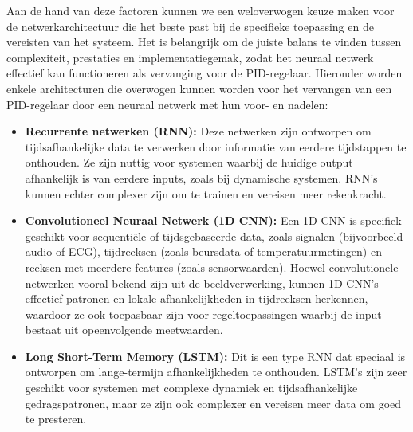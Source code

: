 Aan de hand van deze factoren kunnen we een weloverwogen keuze maken voor de netwerkarchitectuur die het beste past bij de specifieke toepassing en de vereisten van het systeem. Het is belangrijk om de juiste balans te vinden tussen complexiteit, prestaties en implementatiegemak, zodat het neuraal netwerk effectief kan functioneren als vervanging voor de PID-regelaar. Hieronder worden enkele architecturen die overwogen kunnen worden voor het vervangen van een PID-regelaar door een neuraal netwerk met hun voor- en nadelen:
\begin{itemize}  
  \item \textbf{Recurrente netwerken (RNN):} Deze netwerken zijn ontworpen om tijdsafhankelijke data te verwerken door informatie van eerdere tijdstappen te onthouden. Ze zijn nuttig voor systemen waarbij de huidige output afhankelijk is van eerdere inputs, zoals bij dynamische systemen. RNN's kunnen echter complexer zijn om te trainen en vereisen meer rekenkracht.
  \item \textbf{Convolutioneel Neuraal Netwerk (1D CNN):} Een 1D CNN is specifiek geschikt voor sequentiële of tijdsgebaseerde data, zoals signalen (bijvoorbeeld audio of ECG), tijdreeksen (zoals beursdata of temperatuurmetingen) en reeksen met meerdere features (zoals sensorwaarden). Hoewel convolutionele netwerken vooral bekend zijn uit de beeldverwerking, kunnen 1D CNN's effectief patronen en lokale afhankelijkheden in tijdreeksen herkennen, waardoor ze ook toepasbaar zijn voor regeltoepassingen waarbij de input bestaat uit opeenvolgende meetwaarden.
  \item \textbf{Long Short-Term Memory (LSTM):} Dit is een type RNN dat speciaal is ontworpen om lange-termijn afhankelijkheden te onthouden. LSTM's zijn zeer geschikt voor systemen met complexe dynamiek en tijdsafhankelijke gedragspatronen, maar ze zijn ook complexer en vereisen meer data om goed te presteren.
\end{itemize}

